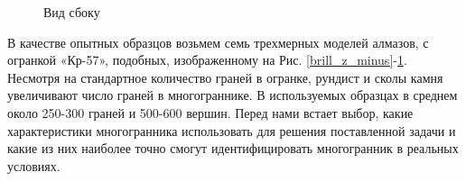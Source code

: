 \documentclass[a4paper,12pt, titlepage]{article}
\begin{document}
\begin{figure}[h]
\noindent{}
\caption{Вид сбоку}
\label{brill_x_plus}
\end{figure}
В качестве опытных образцов возьмем семь трехмерных моделей алмазов, с огранкой «Кр-57», подобных, 
изображенному на Рис. \ref{brill_z_minus}-\ref{brill_x_plus}. Несмотря на стандартное количество граней в 
огранке, рундист и сколы камня увеличивают число граней в многограннике. В используемых образцах в среднем около
250-300 граней и 500-600 вершин. Перед нами встает выбор, какие характеристики многогранника использовать для решения 
поставленной задачи и какие из них наиболее точно смогут идентифицировать многогранник в реальных условиях.
 
\end{document}
